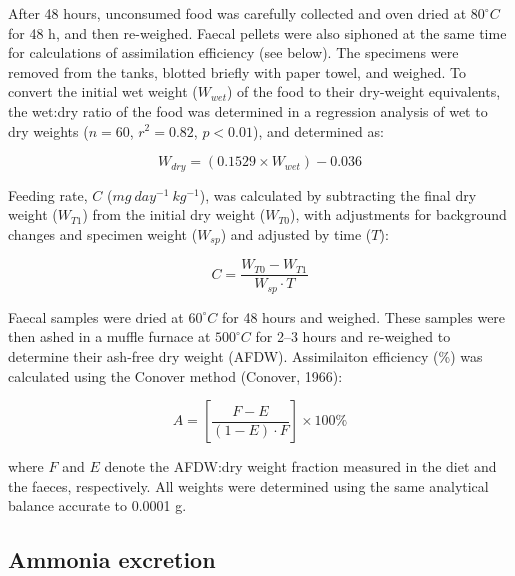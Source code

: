 \documentclass[oneside, a4paper]{memoir}
\theoremstyle{definition}
\theoremstyle{definition}
\theoremstyle{definition}
\theoremstyle{remark}
\begin{document}
After 48 hours, unconsumed food was carefully collected and oven dried
at \(80^{\circ}C\) for 48 h, and then re-weighed. Faecal pellets were
also siphoned at the same time for calculations of assimilation
efficiency (see below). The specimens were removed from the tanks,
blotted briefly with paper towel, and weighed. To convert the initial
wet weight (\(W_{wet}\)) of the food to their dry-weight equivalents,
the wet:dry ratio of the food was determined in a regression analysis of
wet to dry weights (\(n = 60\), \(r^2 = 0.82\), \(p < 0.01\)), and
determined as:

\begin{equation}
  W_{dry} = (0.1529 \times W_{wet}) - 0.036
  \label{eq:wdry}
\end{equation}

Feeding rate, \(C\) (\(mg\ day^{-1}\ kg^{-1}\)), was calculated by
subtracting the final dry weight (\(W_{T1}\)) from the initial dry
weight (\(W_{T0}\)), with adjustments for background changes and
specimen weight (\(W_{sp}\)) and adjusted by time (\(T\)):

\begin{equation}
  C = \frac{W_{T0} - W_{T1}}{W_{sp} \cdot T}
  \label{eq:c}
\end{equation}

Faecal samples were dried at \(60^{\circ}C\) for 48 hours and weighed.
These samples were then ashed in a muffle furnace at \(500^{\circ}C\)
for 2--3 hours and re-weighed to determine their ash-free dry weight
(AFDW). Assimilaiton efficiency (\%) was calculated using the Conover
method (Conover, 1966):

\begin{equation}
  A = \left[ \frac{F - E}{(1 - E) \cdot F} \right] \times 100\%
  \label{eq:a}
\end{equation}

where \(F\) and \(E\) denote the AFDW:dry weight fraction measured in
the diet and the faeces, respectively. All weights were determined using
the same analytical balance accurate to 0.0001 g.

\subsection{Ammonia excretion}\label{ammonia-excretion}
\end{document}
